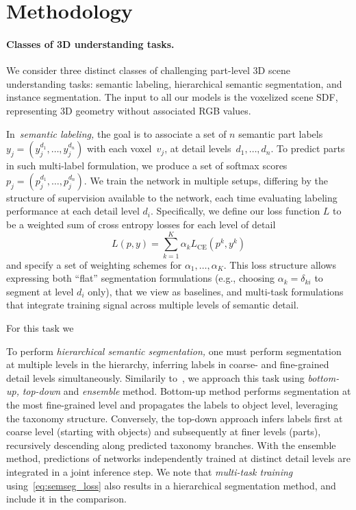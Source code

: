 \section{Methodology}
\label{sec:methods}

\paragraph{Classes of 3D understanding tasks. }
\label{methods:tasks}
We consider three distinct classes of challenging part-level 3D scene understanding tasks: semantic labeling, hierarchical semantic segmentation, and instance segmentation. 
The input to all our models is the voxelized scene SDF, representing 3D geometry without associated RGB values.

In~\emph{semantic labeling,} the goal is to associate a set of $n$ semantic part labels~$y_j = (y_j^{d_1}, \ldots, y_j^{d_n})$ with each voxel~$v_j$, 
at detail levels~$d_1, \ldots, d_n$.
To predict parts in such multi-label formulation, we produce a set of softmax scores $p_j = (p_j^{d_1}, \ldots, p_j^{d_n})$.
We train the network in multiple setups, differing by the structure of supervision available to the network, each time evaluating labeling performance at each detail level $d_i$. Specifically, we define 
our loss function $L$ to be a weighted sum of cross entropy losses for each level of detail
\begin{equation}
\label{eq:semseg_loss}
L(p, y) = \sum_{k = 1}^K \alpha_k L_{\text{CE}}(p^k, y^k)
\end{equation}
and specify a set of weighting schemes for $\alpha_1, \ldots, \alpha_K$. 
This loss structure allows expressing both ``flat'' segmentation formulations (e.g., choosing $\alpha_{k} = \delta_{ki}$ to segment at level $d_i$ only), that we view as baselines, and multi-task formulations that integrate training signal across multiple levels of semantic detail.

For this task we 

To perform \emph{hierarchical semantic segmentation,} one must perform segmentation at multiple levels in the hierarchy, inferring labels in coarse- and fine-grained detail levels simultaneously. 
Similarily to~\cite{mo2019partnet}, we approach this task using \emph{bottom-up,} \emph{top-down} and \emph{ensemble} method.
Bottom-up method performs segmentation at the most fine-grained level and propagates the labels to object level, leveraging the taxonomy structure.
Conversely, the top-down approach infers labels first at coarse level (starting with objects) and subsequently at finer levels (parts), recursively descending along predicted taxonomy branches.
With the ensemble method, predictions of networks independently trained at distinct detail levels are integrated in a joint inference step.
We note that \emph{multi-task training} using~\eqref{eq:semseg_loss} also results in a hierarchical segmentation method, and include it in the comparison.






